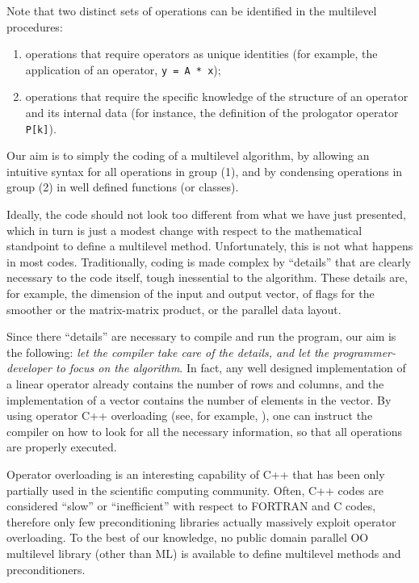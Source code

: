 \documentclass{article}[11pt]
\newcommand{\ML}     {{\sc ML}}
\begin{document}
Note that two distinct sets of operations can be identified in the multilevel
procedures:
\begin{enumerate}
\item operations that require operators as unique identities (for example,
  the application of an operator, \verb!y = A * x!);
\item operations that require the specific knowledge of the structure
  of an operator and its internal data (for instance, the definition of the
  prologator operator \verb!P[k]!).
\end{enumerate}

Our aim is to simply the coding of a multilevel algorithm, by allowing
an intuitive syntax for all operations in group (1), and by condensing
operations in group (2) in well defined functions (or classes). 

Ideally, the
code should not look too different from what we have just presented, which
in turn is just a modest change with respect to the mathematical standpoint
to define a multilevel method. Unfortunately, this is not what happens in most
codes.
Traditionally, coding is made complex by ``details'' that are 
clearly necessary to the code itself, tough inessential to the algorithm. 
These details are, for
example, the dimension of the input and output vector, of flags for the
smoother or the matrix-matrix product, or the parallel data layout.

Since there ``details'' are necessary to compile and run the program, 
  our aim is the following: {\em let the
compiler take care of the details, and let the programmer-developer to
focus on the algorithm}. In fact, any well designed implementation of a linear
operator already contains the number of rows and columns, and the
implementation of a vector contains the number of elements in the vector.
By using operator C++ overloading (see, for example, \cite{stroustrup91cpp}), 
  one can instruct the compiler on how to
look for all the necessary information, so that all operations are properly
executed.

\smallskip

Operator overloading is an interesting capability of C++ that has been only
partially used in the scientific computing community. Often, C++ codes are
considered ``slow'' or ``inefficient'' with respect to FORTRAN and C codes,
therefore only few preconditioning libraries actually massively exploit 
operator overloading. To the best of our knowledge, no public domain parallel
OO multilevel library (other than \ML) is available to
define multilevel methods and preconditioners.
\end{document}

